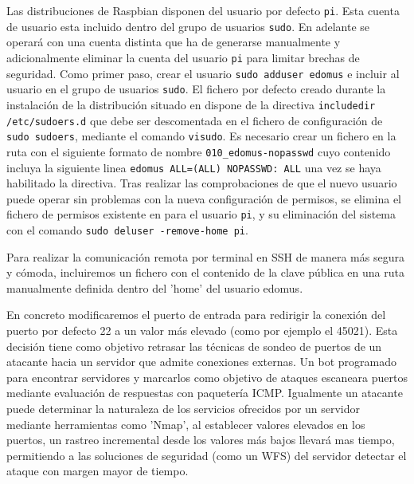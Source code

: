 \vspace{1cm}

Las distribuciones de Raspbian disponen del usuario por defecto \verb|pi|. Esta cuenta de usuario esta incluido dentro del grupo de usuarios \verb|sudo|. En adelante se operará con una cuenta distinta que ha de generarse manualmente y adicionalmente eliminar la cuenta del usuario \verb|pi| para limitar brechas de seguridad. Como primer paso, crear el usuario \verb|sudo adduser edomus| e incluir al usuario en el grupo de usuarios \verb|sudo|. El fichero por defecto creado durante la instalación de la distribución situado en  dispone de la directiva \verb|includedir /etc/sudoers.d| que debe ser descomentada en el fichero de configuración de \verb|sudo sudoers|, mediante el comando \verb|visudo|. Es necesario crear un fichero en la ruta  con el siguiente formato de nombre \verb|010_edomus-nopasswd| cuyo contenido incluya la siguiente linea \verb|edomus ALL=(ALL) NOPASSWD: ALL| una vez se haya habilitado la directiva. Tras realizar las comprobaciones de que el nuevo usuario puede operar sin problemas con la nueva configuración de permisos, se elimina el fichero de permisos existente en  para el usuario \verb|pi|, y su eliminación del sistema con el comando \verb|sudo deluser -remove-home pi|.

\vspace{1cm}

Para realizar la comunicación remota por terminal en SSH de manera más segura y cómoda, incluiremos un fichero con el contenido de la clave pública en una ruta manualmente definida dentro del 'home' del usuario edomus.

\vspace{1cm}

En concreto modificaremos el puerto de entrada para redirigir la conexión del puerto por defecto 22 a un valor más elevado (como por ejemplo el 45021). Esta decisión tiene como objetivo retrasar las técnicas de sondeo de puertos de un atacante hacia un servidor que admite conexiones externas. Un bot programado para encontrar servidores y marcarlos como objetivo de ataques escaneara puertos mediante evaluación de respuestas con paquetería ICMP. Igualmente un atacante puede determinar la naturaleza de los servicios ofrecidos por un servidor mediante herramientas como 'Nmap', al establecer valores elevados en los puertos, un rastreo incremental desde los valores más bajos llevará mas tiempo, permitiendo a las soluciones de seguridad (como un WFS) del servidor detectar el ataque con margen mayor de tiempo.

